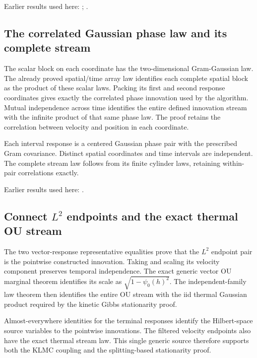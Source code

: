 \documentclass[11pt,a4paper]{report}
\begin{document}
Earlier results used here: \cite[Section~3.8.16]{LangevinLean2026ULASC}; \cite[Section~3.8.17]{LangevinLean2026ULASC}.
\subsection{\texorpdfstring{The correlated Gaussian phase law and its complete stream}{The correlated Gaussian phase law and its complete stream}}
\label{report-step-KineticLangevin-GenericCanonicalSource-lean-2}


The scalar block on each coordinate has the two-dimensional Gram-Gaussian law. The already proved spatial/\allowbreak{}time array law identifies each complete spatial block as the product of these scalar laws. Packing its first and second response coordinates gives exactly the correlated phase innovation used by the algorithm. Mutual independence across time identifies the entire defined innovation stream with the infinite product of that same phase law. The proof retains the correlation between velocity and position in each coordinate.



Each interval response is a centered Gaussian phase pair with the prescribed Gram covariance. Distinct spatial coordinates and time intervals are independent. The complete stream law follows from its finite cylinder laws, retaining within-pair correlations exactly.



Earlier results used here: \cite[Section~3.8.17]{LangevinLean2026ULASC}.
\subsection{\texorpdfstring{Connect \(L^{2}\) endpoints and the exact thermal OU stream}{Connect L² endpoints and the exact thermal OU stream}}
\label{report-step-KineticLangevin-GenericCanonicalSource-lean-3}


The two vector-response representative equalities prove that the \(L^{2}\) endpoint pair is the pointwise constructed innovation. Taking and scaling its velocity component preserves temporal independence. The exact generic vector OU marginal theorem identifies its scale as \(\sqrt{1-\psi_0(h)^2}\). The independent-family law theorem then identifies the entire OU stream with the iid thermal Gaussian product required by the kinetic Gibbs stationarity proof.



Almost-everywhere identities for the terminal responses identify the Hilbert-space source variables to the pointwise innovations. The filtered velocity endpoints also have the exact thermal stream law. This single generic source therefore supports both the KLMC coupling and the splitting-based stationarity proof.
\end{document}
